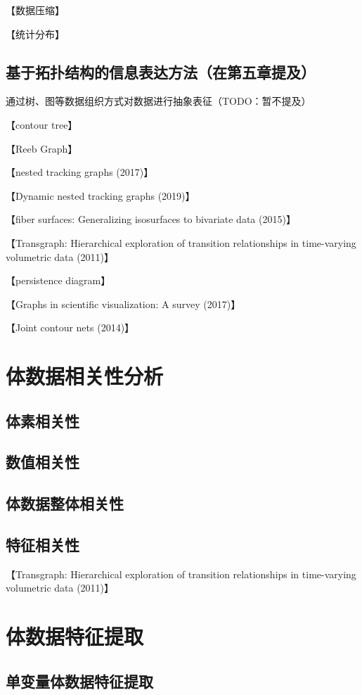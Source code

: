【数据压缩】

【统计分布】

\subsection{基于拓扑结构的信息表达方法（在第五章提及）}

通过树、图等数据组织方式对数据进行抽象表征（TODO：暂不提及）

【contour tree】

【Reeb Graph】

【nested tracking graphs (2017)】

【Dynamic nested tracking graphs (2019)】

【fiber surfaces: Generalizing isosurfaces to bivariate data (2015)】

【Transgraph: Hierarchical exploration of transition relationships in time-varying volumetric data (2011)】

【persistence diagram】

【Graphs in scientific visualization: A survey (2017)】

【Joint contour nets (2014)】


\section{体数据相关性分析}
\subsection{体素相关性}
\subsection{数值相关性}
\subsection{体数据整体相关性}
\subsection{特征相关性}

【Transgraph: Hierarchical exploration of transition relationships in time-varying volumetric data (2011)】

\section{体数据特征提取}
\subsection{单变量体数据特征提取}

